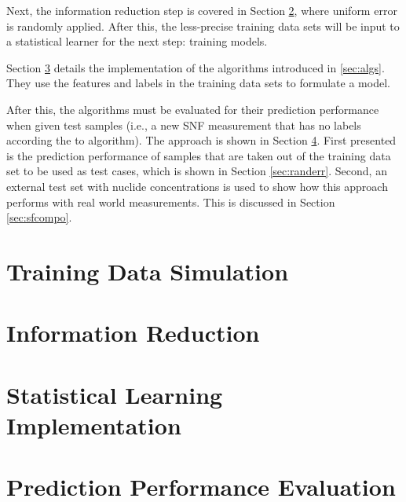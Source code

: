 Next, the information reduction step is covered in Section
\ref{sec:inforeduc1}, where uniform error is randomly applied. After this, the
less-precise training data sets will be input to a statistical learner for the
next step: training models.

Section \ref{sec:statmodel1} details the implementation of the algorithms
introduced in \ref{sec:algs}. They use the features and labels in the training
data sets to formulate a model. 

After this, the algorithms must be evaluated for their prediction performance
when given test samples (i.e., a new \gls{SNF} measurement that has no labels
according the to algorithm).  The approach is shown in Section \ref{sec:eval1}.
First presented is the prediction performance of samples that are taken out of
the training data set to be used as test cases, which is shown in Section
\ref{sec:randerr}.  Second, an external test set with nuclide concentrations is
used to show how this approach performs with real world measurements. This is
discussed in Section \ref{sec:sfcompo}.  

\section{Training Data Simulation}
\label{sec:training1}


\section{Information Reduction}
\label{sec:inforeduc1}


\section{Statistical Learning Implementation}
\label{sec:statmodel1}


\section{Prediction Performance Evaluation}
\label{sec:eval1}


